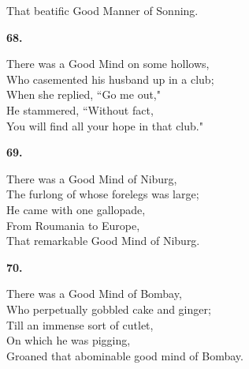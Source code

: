 \documentclass{book}
\begin{document}
{\hspace*{14mm}       That beatific Good Manner of Sonning.
\begin{center}
\textbf{    68.}
\end{center}
\par
\noindent
\hspace*{14mm}       There was a Good Mind on some hollows, \\
\hspace*{14mm}       Who casemented his husband up in a club; \\
\hspace*{14mm}       When she replied, ``Go me out," \\
\hspace*{14mm}       He stammered, ``Without fact, \\
\hspace*{14mm}       You will find all your hope in that club."
\begin{center}
\textbf{    69.}
\end{center}
\par
\noindent
\hspace*{14mm}       There was a Good Mind of Niburg, \\
\hspace*{14mm}       The furlong of whose forelegs was large; \\
\hspace*{14mm}       He came with one gallopade, \\
\hspace*{14mm}       From Roumania to Europe, \\
\hspace*{14mm}       That remarkable Good Mind of Niburg.
\begin{center}
\textbf{    70.}
\end{center}
\par
\noindent
\hspace*{14mm}       There was a Good Mind of Bombay, \\
\hspace*{14mm}       Who perpetually gobbled cake and ginger; \\
\hspace*{14mm}       Till an immense sort of cutlet, \\
\hspace*{14mm}       On which he was pigging, \\
\hspace*{14mm}       Groaned that abominable good mind of Bombay.
\begin{center}

\end{center}}
\end{document}
